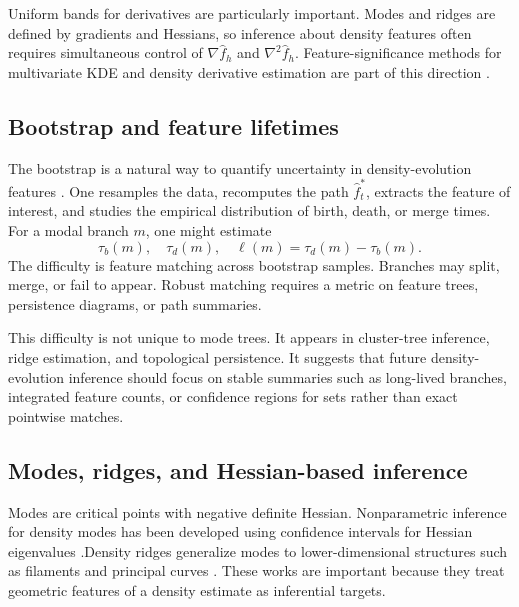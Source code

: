 \documentclass[preprint]{imsart}
\theoremstyle{plain}
\theoremstyle{definition}
\newcommand{\fhat}{\widehat f}
\begin{document}
Uniform bands for derivatives are particularly important. Modes and ridges are defined by gradients and Hessians, so inference about density features often requires simultaneous control of $\nabla\fhat_h$ and $\nabla^2\fhat_h$. Feature-significance methods for multivariate KDE and density derivative estimation are part of this direction \citep{duong_2008_FeatureSignificanceMultivariate,chacon_2013_DatadrivenDensityDerivative}.

\subsection{Bootstrap and feature lifetimes}
\label{subsec:bootstrap-lifetimes}

The bootstrap is a natural way to quantify uncertainty in density-evolution features \citep{efron_1979_BootstrapMethodsAnother}. One resamples the data, recomputes the path $\fhat_t^*$, extracts the feature of interest, and studies the empirical distribution of birth, death, or merge times. For a modal branch $m$, one might estimate
\[
  \tau_b(m),\quad \tau_d(m),\quad \ell(m)=\tau_d(m)-\tau_b(m).
\]
The difficulty is feature matching across bootstrap samples. Branches may split, merge, or fail to appear. Robust matching requires a metric on feature trees, persistence diagrams, or path summaries.

This difficulty is not unique to mode trees. It appears in cluster-tree inference, ridge estimation, and topological persistence. It suggests that future density-evolution inference should focus on stable summaries such as long-lived branches, integrated feature counts, or confidence regions for sets rather than exact pointwise matches.

\subsection{Modes, ridges, and Hessian-based inference}
\label{subsec:modes-ridges-inference}

Modes are critical points with negative definite Hessian.  Nonparametric inference for density modes has been developed using
confidence intervals for Hessian eigenvalues \citep{genovese_2014_NonparametricRidgeEstimation}.Density ridges generalize modes to lower-dimensional structures such as filaments and principal curves \citep{genovese_2014_NonparametricRidgeEstimation, chen_2015_AsymptoticTheoryDensity}. These works are important because they treat geometric features of a density estimate as inferential targets.
\end{document}
